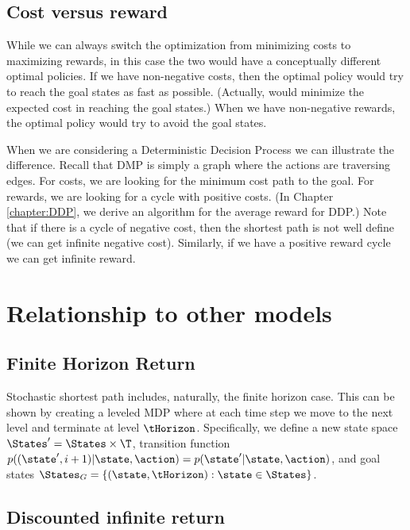 

\subsection{Cost versus reward} 


While we can always switch the optimization from minimizing costs to maximizing rewards, in this case the two would have a conceptually different optimal policies.
If we have non-negative costs, then the optimal policy would try to reach the goal states as fast as possible. (Actually, would minimize the expected cost in reaching the goal states.)
When we have non-negative rewards, the optimal policy would try to avoid the goal states.  

When we are considering a Deterministic Decision Process we can illustrate the difference.
Recall that DMP is simply a graph where the actions are traversing edges. For costs, we are looking for the minimum cost path to the goal. For rewards, we are looking for a cycle with positive costs. (In Chapter \ref{chapter:DDP}, we derive an algorithm for the average reward for DDP.)
Note that if there is a cycle of negative cost, then the shortest path is not well define 
(we can get infinite negative cost). Similarly, if we have a positive reward cycle we can get infinite reward.

\section{Relationship to other models}


\subsection{Finite Horizon Return}

Stochastic shortest path includes, naturally, the finite horizon case. 
This can be shown by creating a leveled MDP where at each time step we move to the next level and terminate at level $\tHorizon$.
Specifically, we define a new state space $\States'=\States\times \T$, transition function $p((\state',i+1)|\state,\action)=p(\state'|\state,\action)$, and goal states $\States_G=\{(\state,\tHorizon):\state \in\States\}$.



\subsection{Discounted infinite return}


